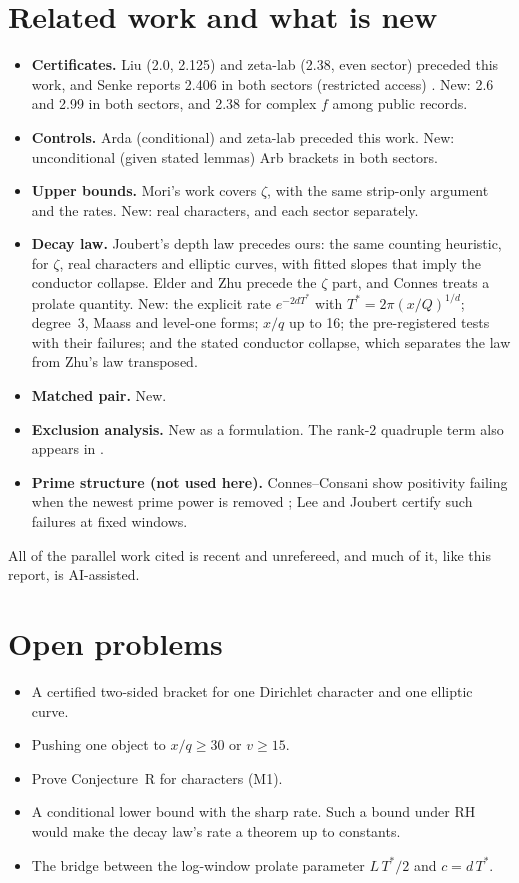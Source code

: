 \documentclass[11pt]{article}
\theoremstyle{remark}
\begin{document}
\section{Related work and what is new}\label{sec:related}
\begin{itemize}
\item \textbf{Certificates.} Liu (2.0, 2.125) and zeta-lab (2.38, even sector) preceded this work, and Senke reports 2.406 in both sectors (restricted access) \cite{senke26}. New: 2.6 and 2.99 in both sectors, and 2.38 for complex $f$ among public records.
\item \textbf{Controls.} Arda (conditional) and zeta-lab preceded this work. New: unconditional (given stated lemmas) Arb brackets in both sectors.
\item \textbf{Upper bounds.} Mori's work covers $\zeta$, with the same strip-only argument and the rates. New: real characters, and each sector separately.
\item \textbf{Decay law.} Joubert's depth law \cite{joubert26} precedes ours: the same counting heuristic, for $\zeta$, real characters and elliptic curves, with fitted slopes that imply the conductor collapse. Elder \cite{elder26} and Zhu \cite{zhu26} precede the $\zeta$ part, and Connes treats a prolate quantity. New: the explicit rate $e^{-2dT^*}$ with $T^*=2\pi(x/Q)^{1/d}$; degree~3, Maass and level-one forms; $x/q$ up to 16; the pre-registered tests with their failures; and the stated conductor collapse, which separates the law from Zhu's law transposed.
\item \textbf{Matched pair.} New.
\item \textbf{Exclusion analysis.} New as a formulation. The rank-2 quadruple term also appears in \cite{rhlab26,kb26}.
\item \textbf{Prime structure (not used here).} Connes--Consani show positivity failing when the newest prime power is removed \cite{cc23}; Lee \cite{lee26a} and Joubert \cite{joubert26} certify such failures at fixed windows.
\end{itemize}
All of the parallel work cited is recent and unrefereed, and much of it, like this report, is AI-assisted.

\section{Open problems}
\begin{itemize}
\item A certified two-sided bracket for one Dirichlet character and one elliptic curve.
\item Pushing one object to $x/q\ge30$ or $v\ge15$.
\item Prove Conjecture~R for characters (M1).
\item A conditional lower bound with the sharp rate. Such a bound under RH would make the decay law's rate a theorem up to constants.
\item The bridge between the log-window prolate parameter $L\,T^*/2$ and $c=d\,T^*$.
\end{itemize}
\end{document}
